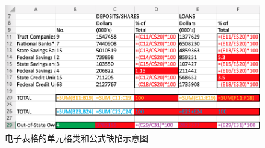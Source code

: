 \begin{figure}[tbp]    
    \centering
    \includegraphics[width=1\textwidth]{figure/figure-3-3.png}
    \caption{电子表格的单元格类和公式缺陷示意图}
    \label{figure-3-3}
\end{figure}